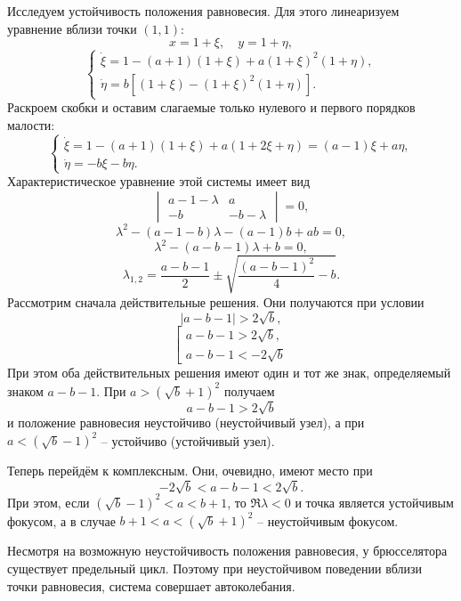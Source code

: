 Исследуем устойчивость положения равновесия. Для этого линеаризуем уравнение
вблизи точки \( (1, 1) \):
\[
    x = 1 + \xi,\quad y = 1 + \eta,
\]
\[
    \left\{
        \begin{array}{l}
            \dot{\xi} = 1 - (a + 1)(1 + \xi) + a(1+\xi)^2(1+\eta),\\
            \dot{\eta} = b[(1+\xi) - (1+\xi)^2(1+\eta)].
        \end{array}
    \right.
\]
Раскроем скобки и оставим слагаемые только нулевого и первого порядков малости:
\[
    \left\{
        \begin{array}{l}
            \dot{\xi} = 1 - (a + 1)(1 + \xi) + a(1+2\xi+\eta) =
                (a-1)\xi + a\eta, \\
            \dot{\eta} = -b\xi -b\eta.
        \end{array}
    \right.
\]
Характеристическое уравнение этой системы имеет вид
\[
    \begin{vmatrix}
        a - 1 - \lambda & a           \\
        -b              & -b - \lambda
    \end{vmatrix}
    = 0,
\]
\[
    \lambda^2 - (a-1 - b) \lambda - (a-1)b + ab = 0,
\]
\[
    \lambda^2 - (a - b - 1) \lambda + b = 0,
\]
\[
    \lambda_{1,2} = \frac{a-b-1}{2} \pm \sqrt{\frac{(a-b-1)^2}{4} - b}.
\]
Рассмотрим сначала действительные решения. Они получаются при условии
\[
    |a - b - 1| > 2\sqrt{b},
\]
\[
    \left[
        \begin{array}{l}
            a - b - 1 > 2\sqrt{b},\\
            a - b - 1 < -2\sqrt{b}
        \end{array}
    \right.
\]
При этом оба действительных решения имеют один и тот же знак, определяемый
знаком \( a - b - 1 \). При \( a > (\sqrt{b} + 1)^2 \) получаем
\[
    a - b - 1 > 2\sqrt{b}
\]
и положение равновесия неустойчиво (неустойчивый узел), а при
\( a < (\sqrt{b} - 1)^2 \) -- устойчиво (устойчивый узел).

Теперь перейдём к комплексным. Они, очевидно, имеют место при
\[
    -2\sqrt{b} < a - b - 1 < 2\sqrt{b}.
\]
При этом, если \( (\sqrt{b} - 1)^2 < a < b + 1 \), то \( \Re\lambda < 0 \) и
точка является устойчивым фокусом, а в случае \( b + 1 < a < (\sqrt{b} + 1)^2 \)
-- неустойчивым фокусом.

Несмотря на возможную неустойчивость положения равновесия, у брюсселятора
существует предельный цикл. Поэтому при неустойчивом поведении вблизи точки
равновесия, система совершает автоколебания.

